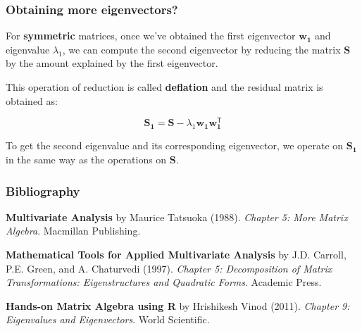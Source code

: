 \documentclass[12pt]{beamer}\usepackage[]{graphicx}\usepackage[]{color}
\begin{document}
\begin{frame}
\frametitle{Obtaining more eigenvectors?}

For \textbf{symmetric} matrices, once we've obtained the first eigenvector 
$\mathbf{w_1}$ and eigenvalue $\lambda_1$, we can compute the second eigenvector 
by reducing the matrix $\mathbf{S}$ by the 
amount explained by the first eigenvector. 

\bigskip
This operation of reduction is called \textbf{deflation} 
and the residual matrix is obtained as:

{\large
$$
\mathbf{S_1} = \mathbf{S} - \lambda_1 \mathbf{w_1 w_{1}^\mathsf{T}}
$$
}

To get the second eigenvalue and its corresponding eigenvector, 
we operate on $\mathbf{S_1}$ in the same way as the operations on $\mathbf{S}$.

\end{frame}


\begin{frame}
\frametitle{Bibliography}

{\footnotesize
\bi
  \item \textbf{Multivariate Analysis} by Maurice Tatsuoka (1988).
  \textit{Chapter 5: More Matrix Algebra}. Macmillan Publishing.
  \item \textbf{Mathematical Tools for Applied Multivariate Analysis} by J.D. Carroll, P.E. Green, and A. Chaturvedi (1997). 
  \textit{Chapter 5: Decomposition of Matrix Transformations: Eigenstructures and Quadratic Forms}. Academic Press. 
  \item \textbf{Hands-on Matrix Algebra using R} by Hrishikesh Vinod (2011).
  \textit{Chapter 9: Eigenvalues and Eigenvectors}. World Scientific.
\ei
}

\end{frame}

\end{document}
